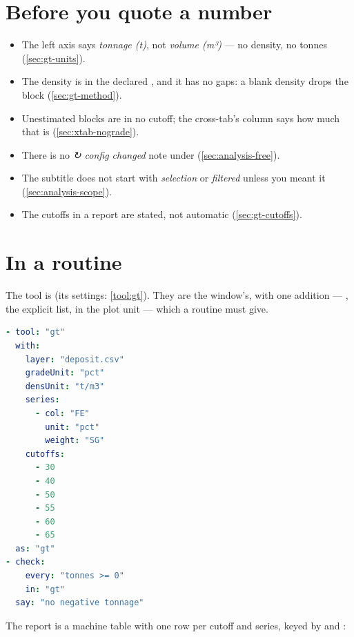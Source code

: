 \section{Before you quote a number}\label{sec:gt-pitfalls}
\begin{itemize}
\item The left axis says \emph{tonnage (t)}, not \emph{volume (m³)} — no density, no tonnes (\cref{sec:gt-units}).
\item The density is in the declared , and it has no gaps: a blank density drops the block (\cref{sec:gt-method}).
\item Unestimated blocks are in no cutoff; the cross-tab's  column says how much that is (\cref{sec:xtab-nograde}).
\item There is no \emph{↻ config changed} note under  (\cref{sec:analysis-free}).
\item The subtitle does not start with \emph{selection} or \emph{filtered} unless you meant it (\cref{sec:analysis-scope}).
\item The cutoffs in a report are stated, not automatic (\cref{sec:gt-cutoffs}).
\end{itemize}

\section{In a routine}\label{sec:gt-routine}
The tool is  (its settings: \cref{tool:gt}). They are the window's, with one addition — , the explicit list, in the plot unit  — which a routine must give.

\begin{lstlisting}[language=yaml]
- tool: "gt"
  with:
    layer: "deposit.csv"
    gradeUnit: "pct"
    densUnit: "t/m3"
    series:
      - col: "FE"
        unit: "pct"
        weight: "SG"
    cutoffs:
      - 30
      - 40
      - 50
      - 55
      - 60
      - 65
  as: "gt"
- check:
    every: "tonnes >= 0"
    in: "gt"
  say: "no negative tonnage"
\end{lstlisting}

The report is a machine table with one row per cutoff and series, keyed by  and :

